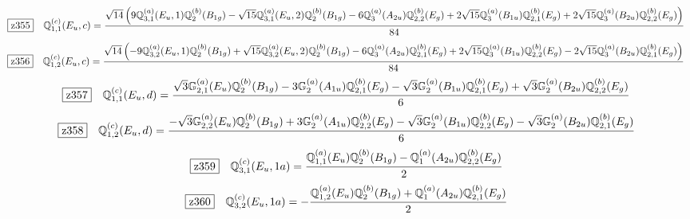 \documentclass[fleqn,10pt,landscape]{jsarticle}
\begin{document}
\begin{dmath*}
\hspace*{3mm}\fbox{z355}\quad \mathbb{Q}_{1,1}^{(c)}(E_{u},c)=\frac{\sqrt{14} \left(9 \mathbb{Q}_{3,1}^{(a)}(E_{u},1) \mathbb{Q}_{2}^{(b)}(B_{1g}) - \sqrt{15} \mathbb{Q}_{3,1}^{(a)}(E_{u},2) \mathbb{Q}_{2}^{(b)}(B_{1g}) - 6 \mathbb{Q}_{3}^{(a)}(A_{2u}) \mathbb{Q}_{2,2}^{(b)}(E_{g}) + 2 \sqrt{15} \mathbb{Q}_{3}^{(a)}(B_{1u}) \mathbb{Q}_{2,1}^{(b)}(E_{g}) + 2 \sqrt{15} \mathbb{Q}_{3}^{(a)}(B_{2u}) \mathbb{Q}_{2,2}^{(b)}(E_{g})\right)}{84}
\end{dmath*}
\begin{dmath*}
\hspace*{3mm}\fbox{z356}\quad \mathbb{Q}_{1,2}^{(c)}(E_{u},c)=\frac{\sqrt{14} \left(- 9 \mathbb{Q}_{3,2}^{(a)}(E_{u},1) \mathbb{Q}_{2}^{(b)}(B_{1g}) + \sqrt{15} \mathbb{Q}_{3,2}^{(a)}(E_{u},2) \mathbb{Q}_{2}^{(b)}(B_{1g}) - 6 \mathbb{Q}_{3}^{(a)}(A_{2u}) \mathbb{Q}_{2,1}^{(b)}(E_{g}) + 2 \sqrt{15} \mathbb{Q}_{3}^{(a)}(B_{1u}) \mathbb{Q}_{2,2}^{(b)}(E_{g}) - 2 \sqrt{15} \mathbb{Q}_{3}^{(a)}(B_{2u}) \mathbb{Q}_{2,1}^{(b)}(E_{g})\right)}{84}
\end{dmath*}
\begin{dmath*}
\hspace*{3mm}\fbox{z357}\quad \mathbb{Q}_{1,1}^{(c)}(E_{u},d)=\frac{\sqrt{3} \mathbb{G}_{2,1}^{(a)}(E_{u}) \mathbb{Q}_{2}^{(b)}(B_{1g}) - 3 \mathbb{G}_{2}^{(a)}(A_{1u}) \mathbb{Q}_{2,1}^{(b)}(E_{g}) - \sqrt{3} \mathbb{G}_{2}^{(a)}(B_{1u}) \mathbb{Q}_{2,1}^{(b)}(E_{g}) + \sqrt{3} \mathbb{G}_{2}^{(a)}(B_{2u}) \mathbb{Q}_{2,2}^{(b)}(E_{g})}{6}
\end{dmath*}
\begin{dmath*}
\hspace*{3mm}\fbox{z358}\quad \mathbb{Q}_{1,2}^{(c)}(E_{u},d)=\frac{- \sqrt{3} \mathbb{G}_{2,2}^{(a)}(E_{u}) \mathbb{Q}_{2}^{(b)}(B_{1g}) + 3 \mathbb{G}_{2}^{(a)}(A_{1u}) \mathbb{Q}_{2,2}^{(b)}(E_{g}) - \sqrt{3} \mathbb{G}_{2}^{(a)}(B_{1u}) \mathbb{Q}_{2,2}^{(b)}(E_{g}) - \sqrt{3} \mathbb{G}_{2}^{(a)}(B_{2u}) \mathbb{Q}_{2,1}^{(b)}(E_{g})}{6}
\end{dmath*}
\begin{dmath*}
\hspace*{3mm}\fbox{z359}\quad \mathbb{Q}_{3,1}^{(c)}(E_{u},1a)=\frac{\mathbb{Q}_{1,1}^{(a)}(E_{u}) \mathbb{Q}_{2}^{(b)}(B_{1g}) - \mathbb{Q}_{1}^{(a)}(A_{2u}) \mathbb{Q}_{2,2}^{(b)}(E_{g})}{2}
\end{dmath*}
\begin{dmath*}
\hspace*{3mm}\fbox{z360}\quad \mathbb{Q}_{3,2}^{(c)}(E_{u},1a)=- \frac{\mathbb{Q}_{1,2}^{(a)}(E_{u}) \mathbb{Q}_{2}^{(b)}(B_{1g}) + \mathbb{Q}_{1}^{(a)}(A_{2u}) \mathbb{Q}_{2,1}^{(b)}(E_{g})}{2}
\end{dmath*}
\end{document}
